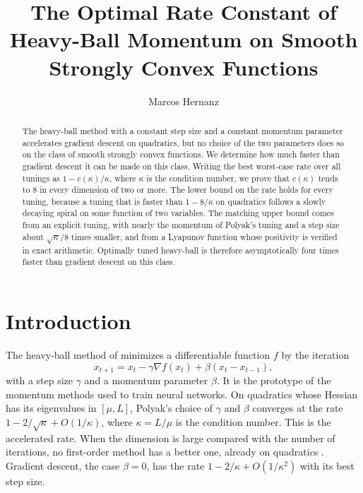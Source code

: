 \documentclass[11pt, a4paper]{article}
\title{The Optimal Rate Constant of Heavy-Ball Momentum on Smooth Strongly Convex Functions}
\author{Marcos Hernanz}
\theoremstyle{definition}
\begin{document}
\maketitle

\begin{abstract}
  The heavy-ball method with a constant step size and a constant momentum parameter accelerates gradient descent on
  quadratics, but no choice of the two parameters does so on the class of smooth strongly convex functions. We determine how much faster
  than gradient descent it can be made on this class. Writing the best worst-case rate over all tunings as
  $1-c(\kappa)/\kappa$, where $\kappa$ is the condition number, we prove that $c(\kappa)$ tends to $8$ in every
  dimension of two or more. The lower bound on the rate holds for every tuning, because a tuning that is faster than
  $1-8/\kappa$ on quadratics follows a slowly decaying spiral on some function of two variables. The matching upper bound
  comes from an explicit tuning, with nearly the momentum of Polyak's tuning and a step size about $\sqrt\kappa/8$ times
  smaller, and from a Lyapunov function whose positivity is verified in exact arithmetic. Optimally tuned heavy-ball is
  therefore asymptotically four times faster than gradient descent on this class.
\end{abstract}

\tableofcontents

\section{Introduction}
\label{sec:introduction}

The heavy-ball method of \citet{polyak1964some} minimizes a differentiable function $f$ by the iteration
\begin{equation}
  x_{t+1}=x_t-\gamma\nabla f(x_t)+\beta(x_t-x_{t-1}),
  \label{eq:hb}
\end{equation}
with a step size $\gamma$ and a momentum parameter $\beta$. It is the prototype of the momentum methods used to train
neural networks. On quadratics whose Hessian has its eigenvalues in $[\mu,L]$, Polyak's choice of $\gamma$ and $\beta$
converges at the rate $1-2/\sqrt\kappa+O(1/\kappa)$, where $\kappa=L/\mu$ is the condition number. This is the
accelerated rate. When the dimension is large compared with the number of iterations, no first-order method has
a better one, already on quadratics \citep[Thm.~2.1.13]{nemirovski1983problem,nesterov2018lectures}. Gradient
descent, the case $\beta=0$, has the rate $1-2/\kappa+O(1/\kappa^2)$ with its best step size.
\end{document}
